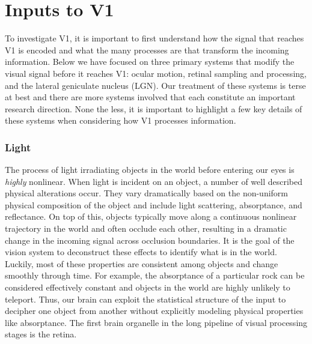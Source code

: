 \section{Inputs to V1}
To investigate V1, it is important to first understand how the signal that reaches V1 is encoded and what the many processes are that transform the incoming information. Below we have focused on three primary systems that modify the visual signal before it reaches V1: ocular motion, retinal sampling and processing, and the lateral geniculate nucleus (LGN). Our treatment of these systems is terse at best and there are more systems involved that each constitute an important research direction. None the less, it is important to highlight a few key details of these systems when considering how V1 processes information.


\subsubsection{Light}
The process of light irradiating objects in the world before entering our eyes is \textit{highly} nonlinear. When light is incident on an object, a number of well described physical alterations occur. They vary dramatically based on the non-uniform physical composition of the object and include light scattering, absorptance, and reflectance. On top of this, objects typically move along a continuous nonlinear trajectory in the world and often occlude each other, resulting in a dramatic change in the incoming signal across occlusion boundaries. It is the goal of the vision system to deconstruct these effects to identify what is in the world. Luckily, most of these properties are consistent among objects and change smoothly through time. For example, the absorptance of a particular rock can be considered effectively constant and objects in the world are highly unlikely to teleport. Thus, our brain can exploit the statistical structure of the input to decipher one object from another without explicitly modeling physical properties like absorptance. The first brain organelle in the long pipeline of visual processing stages is the retina.


